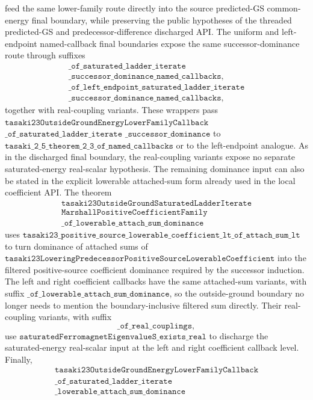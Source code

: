 \documentclass[a4paper,11pt]{article}
\begin{document}
feed the same lower-family route directly into the source predicted-GS
common-energy final boundary, while preserving the public hypotheses of the
threaded predicted-GS and predecessor-difference discharged API.
The uniform and left-endpoint named-callback final boundaries expose the same
successor-dominance route through suffixes
\[
\begin{gathered}
\texttt{\_of\_saturated\_ladder\_iterate}\\
\texttt{\_successor\_dominance\_named\_callbacks},\\
\texttt{\_of\_left\_endpoint\_saturated\_ladder\_iterate}\\
\texttt{\_successor\_dominance\_named\_callbacks},
\end{gathered}
\]
together with real-coupling variants.  These wrappers pass
\(\texttt{tasaki23OutsideGroundEnergyLowerFamilyCallback}\)
\(\texttt{\_of\_saturated\_ladder\_iterate}\)
\(\texttt{\_successor\_dominance}\) to
\(\texttt{tasaki\_2\_5\_theorem\_2\_3\_of\_named\_callbacks}\) or to the
left-endpoint analogue.  As in the discharged final boundary, the
real-coupling variants expose no separate saturated-energy real-scalar
hypothesis.
The remaining dominance input can also be stated in the explicit lowerable
attached-sum form already used in the local coefficient API.  The theorem
\[
\begin{gathered}
\texttt{tasaki23OutsideGroundSaturatedLadderIterate}\\
\texttt{MarshallPositiveCoefficientFamily}\\
\texttt{\_of\_lowerable\_attach\_sum\_dominance}
\end{gathered}
\]
uses
\(\texttt{tasaki23\_positive\_source\_lowerable\_coefficient\_lt\_of\_attach\_sum\_lt}\)
to turn dominance of attached sums of
\(\texttt{tasaki23LoweringPredecessorPositiveSourceLowerableCoefficient}\)
into the filtered positive-source coefficient dominance required by the
successor induction.  The left and right coefficient callbacks have the same
attached-sum variants, with suffix
\(\texttt{\_of\_lowerable\_attach\_sum\_dominance}\), so the outside-ground
boundary no longer needs to mention the boundary-inclusive filtered sum
directly.  Their real-coupling variants, with suffix
\[
\texttt{\_of\_real\_couplings},
\]
use \(\texttt{saturatedFerromagnetEigenvalueS\_exists\_real}\) to discharge
the saturated-energy real-scalar input at the left and right coefficient
callback level.  Finally,
\[
\begin{gathered}
\texttt{tasaki23OutsideGroundEnergyLowerFamilyCallback}\\
\texttt{\_of\_saturated\_ladder\_iterate}\\
\texttt{\_lowerable\_attach\_sum\_dominance}
\end{gathered}
\]
\end{document}
